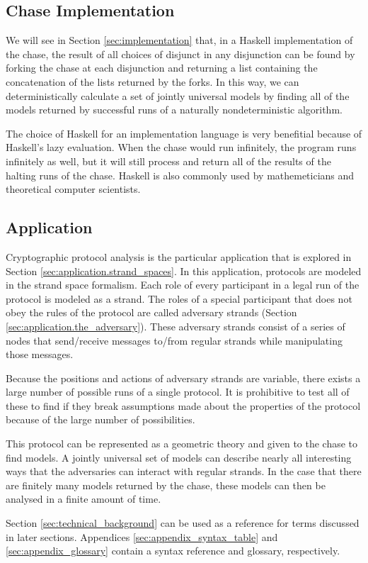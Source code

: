 	\subsection{Chase Implementation}

		We will see in Section \ref{sec:implementation} that, in a Haskell
		implementation of the chase, the result of all choices of disjunct in
		any disjunction can be found by forking the chase at each disjunction
		and returning a list containing the concatenation of the lists returned
		by the forks. In this way, we can deterministically calculate a set of
		jointly universal models by finding all of the models returned by
		successful runs of a naturally nondeterministic algorithm.

		The choice of Haskell for an implementation language is very benefitial
		because of Haskell's lazy evaluation. When the chase would run
		infinitely, the program runs infinitely as well, but it will still
		process and return all of the results of the halting runs of the chase.
		Haskell is also commonly used by mathemeticians and theoretical
		computer scientists.

	\subsection{Application}

		Cryptographic protocol analysis is the particular application that is
		explored in Section \ref{sec:application.strand_spaces}. In this
		application, protocols are modeled in the strand space formalism. Each
		role of every participant in a legal run of the protocol is modeled as
		a strand. The roles of a special participant that does not obey the
		rules of the protocol are called adversary strands (Section
		\ref{sec:application.the_adversary}). These adversary strands consist
		of a series of nodes that send/receive messages to/from regular strands
		while manipulating those messages.

		Because the positions and actions of adversary strands are variable,
		there exists a large number of possible runs of a single protocol. It
		is prohibitive to test all of these to find if they break assumptions
		made about the properties of the protocol because of the large number
		of possibilities.

		This protocol can be represented as a geometric theory and given to the
		chase to find models. A jointly universal set of models can describe
		nearly all interesting ways that the adversaries can interact with
		regular strands. In the case that there are finitely many models
		returned by the chase, these models can then be analysed in a finite
		amount of time.

	Section \ref{sec:technical_background} can be used as a reference for terms
	discussed in later sections. Appendices \ref{sec:appendix_syntax_table} and
	\ref{sec:appendix_glossary} contain a syntax reference and glossary,
	respectively.
